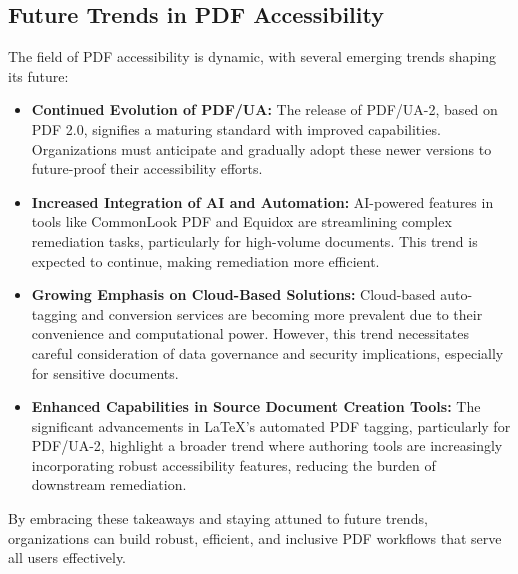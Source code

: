 \subsection{Future Trends in PDF Accessibility}

The field of PDF accessibility is dynamic, with several emerging trends shaping its future:

\begin{itemize}[noitemsep,topsep=0pt]
    \item \textbf{Continued Evolution of PDF/UA:} The release of PDF/UA-2, based on PDF 2.0, signifies a maturing standard with improved capabilities. Organizations must anticipate and gradually adopt these newer versions to future-proof their accessibility efforts.
    \item \textbf{Increased Integration of AI and Automation:} AI-powered features in tools like CommonLook PDF and Equidox are streamlining complex remediation tasks, particularly for high-volume documents. This trend is expected to continue, making remediation more efficient.
    \item \textbf{Growing Emphasis on Cloud-Based Solutions:} Cloud-based auto-tagging and conversion services are becoming more prevalent due to their convenience and computational power. However, this trend necessitates careful consideration of data governance and security implications, especially for sensitive documents.
    \item \textbf{Enhanced Capabilities in Source Document Creation Tools:} The significant advancements in LaTeX's automated PDF tagging, particularly for PDF/UA-2, highlight a broader trend where authoring tools are increasingly incorporating robust accessibility features, reducing the burden of downstream remediation.
\end{itemize}

By embracing these takeaways and staying attuned to future trends, organizations can build robust, efficient, and inclusive PDF workflows that serve all users effectively.


